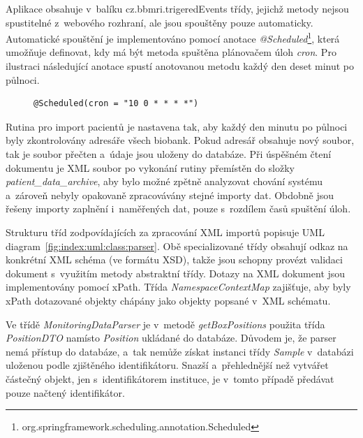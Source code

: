 \documentclass[11pt, draft, oneside]{fithesis2}
\begin{document}
Aplikace obsahuje v~balíku cz.bbmri.trigeredEvents třídy, jejichž metody nejsou spustitelné z~webového rozhraní, ale jsou spouštěny pouze automaticky. Automatické spouštění je implementováno pomocí anotace \textit{@Scheduled}\footnote{org.springframework.scheduling.annotation.Scheduled}, která umožňuje definovat, kdy má být metoda spuštěna plánovačem úloh \textit{cron}. 
Pro ilustraci následující anotace spustí anotovanou metodu každý den deset minut po půlnoci. 
\begin{figure}[h!]
\centering
\begin{BVerbatim}
@Scheduled(cron = "10 0 * * * *")
\end{BVerbatim}
\end{figure}

Rutina pro import pacientů je nastavena tak, aby každý den minutu po půlnoci byly zkontrolovány adresáře všech biobank. Pokud adresář obsahuje nový soubor, tak je soubor přečten a~údaje jsou uloženy do databáze. Při úspěšném čtení dokumentu je XML soubor po vykonání rutiny přemístěn do složky \textit{patient\_data\_archive}, aby bylo možné zpětně analyzovat chování systému a~zároveň nebyly opakovaně zpracovávány stejné importy dat.
Obdobně jsou řešeny importy zaplnění i~naměřených dat, pouze s~rozdílem časů spuštění úloh.

Strukturu tříd zodpovídajících za zpracování XML importů popisuje UML diagram~\ref{fig:index:uml:class:parser}. Obě specializované třídy obsahují odkaz na konkrétní XML schéma (ve formátu XSD), takže jsou schopny provézt validaci dokument s~využitím metody abstraktní třídy. Dotazy na XML dokument jsou implementovány pomocí xPath.
Třída \textit{NamespaceContextMap} zajišťuje, aby byly xPath dotazované objekty chápány jako objekty popsané v~XML schématu.

Ve třídě \textit{MonitoringDataParser} je v~metodě \textit{getBoxPositions} použita třída \textit{PositionDTO} namísto \textit{Position} ukládané do databáze. Důvodem je, že parser nemá přístup do databáze, a~tak nemůže získat instanci třídy \textit{Sample} v~databázi uloženou podle zjištěného identifikátoru. Snazší a~přehlednější než vytvářet částečný objekt, jen s~identifikátorem instituce, je v~tomto případě předávat pouze načtený identifikátor. 
\end{document}
